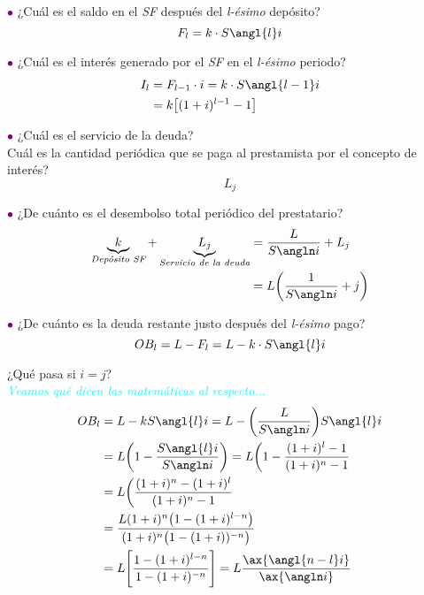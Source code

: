 \textcolor{purple}{$\bullet$} ¿Cuál es el saldo en el \textit{SF} después del \textit{l-ésimo} depósito?
$$F_l=k\cdot S{\angl{l}i}$$

\textcolor{purple}{$\bullet$} ¿Cuál es el interés generado por el \textit{SF} en el \textit{l-ésimo} periodo?
\begin{align*}
    I_l &= F_{l-1}\cdot i = k\cdot S{\angl{l-1}i}\\
    &= k\big[(1+i)^{l-1} -1\big]
\end{align*}

\textcolor{purple}{$\bullet$} ¿Cuál es el servicio de la deuda?\\
Cuál es la cantidad periódica que se paga al prestamista por el concepto de interés?
$$L_j$$

\textcolor{purple}{$\bullet$} ¿De cuánto es el desembolso total periódico del prestatario?
\begin{align*}
    \underbrace{k}_{\textit{Depósito SF}} + \underbrace{L_j}_{\textit{Servicio de la deuda}} &= \frac{L}{S\angln i} + L_j\\
    &= L\bigg(\frac{1}{S\angln i}+j\bigg)
\end{align*}

\textcolor{purple}{$\bullet$} ¿De cuánto es la deuda restante justo después del \textit{l-ésimo} pago?
$$OB_l=L - F_l = L-k\cdot S\angl{l}i$$

¿Qué pasa si $i=j$?\\
\textcolor{cyan}{\textit{Veamos qué dicen las matemáticas al respecto...}}
\begin{align*}
    OB_l &= L-kS\angl{l}i = L-\bigg(\frac{L}{S\angln i}\bigg)S\angl{l}i\\
    &= L\bigg(1-\frac{S\angl{l}i}{S\angln i}\bigg) = L\bigg(1- \frac{(1+i)^l-1}{(1+i)^n-1}\\
    &= L \bigg( \frac{(1+i)^n - (1+i)^l}{(1+i)^n-1}\\
    &= \frac{L(1+i)^n\big(1-(1+i)^{l-n}\big)}{(1+i)^n\big(1-(1+i))^{-n}\big)}\\
    &= L\Bigg[\frac{1-(1+i)^{l-n}}{1-(1+i)^{-n}}\Bigg] = L\frac{\ax{\angl{n-l}i}}{\ax{\angln i}}
\end{align*}


